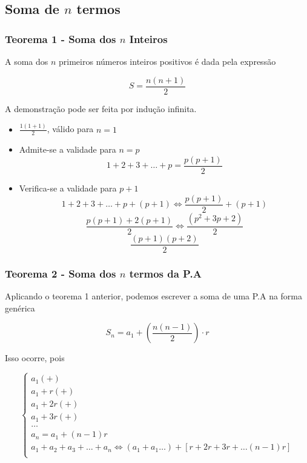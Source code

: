 \subsection{Soma de $n$ termos}

\subsubsection{Teorema 1 - Soma dos $n$ Inteiros}
A soma dos $n$ primeiros números inteiros positivos é dada pela expressão

\begin{tcolorbox}[colback=LightBlue]
\[S = \frac{n(n + 1)}{2}\]
\end{tcolorbox}

A demonstração pode ser feita por indução infinita.

\begin{tcolorbox}[colback=LightYellow]
\begin{itemize}
  \item $\frac{1(1 + 1)}{2}$, válido para $n = 1$
  \item Admite-se a validade para $n = p$
        \[1 + 2 + 3 + \dots + p = \frac{p(p + 1)}{2}\]
  \item Verifica-se a validade para $p + 1$
        \[1 + 2 + 3 + \dots + p + (p + 1) \Leftrightarrow \frac{p(p + 1)}{2} + (p + 1)\]
        \[\frac{p(p + 1) + 2(p + 1)}{2} \Leftrightarrow \frac{(p^{2} + 3p + 2)}{2}\]
        \[\frac{(p + 1)(p + 2)}{2}\]
\end{itemize}
\end{tcolorbox}

\subsubsection{Teorema 2 - Soma dos $n$ termos da P.A}

Aplicando o teorema 1 anterior, podemos escrever a soma de uma P.A na forma genérica

\begin{tcolorbox}[colback=LightBlue]
\[S_{n} = a_{1} + \left(\frac{n(n - 1)}{2}\right)\cdot r\]
\end{tcolorbox}

Isso ocorre, pois

\begin{tcolorbox}[colback=LightGreen]
\begin{equation*}
\begin{cases}
  a_{1} (+) \\
  a_{1} + r (+) \\
  a_{1} + 2r (+) \\
  a_{1} + 3r (+) \\
  \dots \\
  a_{n} = a_{1} + (n - 1)r \\
  \hline
  a_{1} + a_{2} + a_{3} + \dots + a_{n} \Leftrightarrow (a_{1} + a_{1} \dots) + [r + 2r + 3r + \dots (n - 1)r]\\
\end{cases}
\end{equation*}
\end{tcolorbox}

